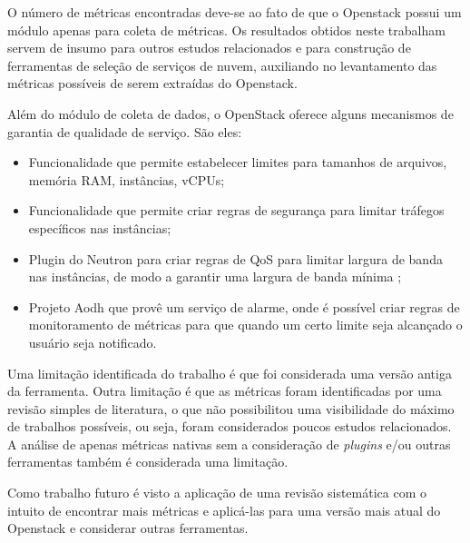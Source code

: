 \documentclass[conference]{IEEEtran}
\begin{document}
O número de métricas encontradas deve-se ao fato de que o Openstack possui um módulo apenas para coleta de métricas. 
Os resultados obtidos neste trabalham servem de insumo para outros estudos relacionados e para construção de ferramentas de seleção de 
serviços de nuvem, auxiliando no levantamento das métricas possíveis de serem extraídas do Openstack.

Além do módulo de coleta de dados, o OpenStack oferece alguns mecanismos de garantia de qualidade de serviço. São eles:

\begin{itemize}
 \item Funcionalidade que permite estabelecer limites para tamanhos de arquivos, memória RAM, instâncias, vCPUs;
 \item Funcionalidade que permite criar regras de segurança para limitar tráfegos específicos nas instâncias;
 \item Plugin do Neutron para criar regras de QoS para limitar largura de banda nas instâncias, de modo 
 a garantir uma largura de banda mínima \cite{openstack_neutron} \cite{openstack_neutron_qos};
 \item Projeto Aodh \cite{openstack_telemetry} que provê um serviço de alarme, onde é possível criar regras de monitoramento de métricas para que 
quando um certo limite seja alcançado o usuário seja notificado.
\end{itemize}


Uma limitação identificada do trabalho é que foi considerada uma versão antiga da ferramenta. Outra limitação é que as métricas
foram identificadas por uma revisão simples de literatura, o que não possibilitou uma visibilidade do máximo de trabalhos possíveis,
ou seja, foram considerados poucos estudos relacionados. A análise de apenas métricas nativas sem a consideração de \textit{plugins} e/ou
outras ferramentas também é considerada uma limitação.

Como trabalho futuro é visto a aplicação de uma revisão sistemática com o intuito de encontrar mais métricas e aplicá-las para
uma versão mais atual do Openstack e considerar outras ferramentas.






% 
% 
\end{document}
